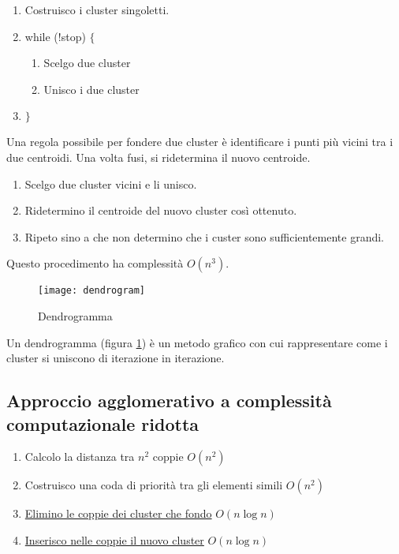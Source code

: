 \documentclass[\main/main.tex]{subfiles}
\begin{document}
\begin{enumerate}
  \item Costruisco i cluster singoletti.
  \item while (!stop) $\{$
        \begin{enumerate}
          \item Scelgo due cluster
          \item Unisco i due cluster
        \end{enumerate}
  \item $\}$
\end{enumerate}

Una regola possibile per fondere due cluster è identificare i punti più vicini tra i due centroidi. Una volta fusi, si ridetermina il nuovo centroide.

\begin{enumerate}
  \item Scelgo due cluster vicini e li unisco.
  \item Ridetermino il centroide del nuovo cluster così ottenuto.
  \item Ripeto sino a che non determino che i custer sono sufficientemente grandi.
\end{enumerate}

Questo procedimento ha complessità $O(n^3)$.

\begin{figure}
  \texttt{[image: dendrogram]}
  \caption{Dendrogramma}
  \label{fig:dendrogram}
\end{figure}

\begin{definition}[Dendrogramma]
  Un dendrogramma (figura \ref{fig:dendrogram}) è un metodo grafico con cui rappresentare come i cluster si uniscono di iterazione in iterazione.
\end{definition}

\subsection{Approccio agglomerativo a complessità computazionale ridotta}

\begin{enumerate}
  \item Calcolo la distanza tra $n^2$ coppie \dotfill \textbf{$O(n^2)$}
  \item Costruisco una coda di priorità tra gli elementi simili \dotfill \textbf{$O(n^2)$}
  \item \underline{Elimino le coppie dei cluster che fondo} \dotfill \textbf{$O(n\log n)$}
  \item \underline{Inserisco nelle coppie il nuovo cluster} \dotfill \textbf{$O(n\log n)$}
\end{enumerate}
\end{document}
